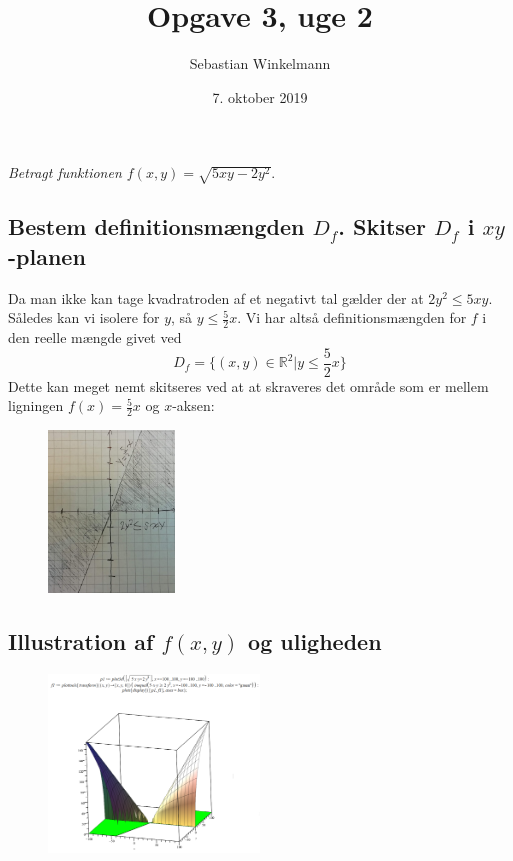 \documentclass{report}
\title{Opgave 3, uge 2}
\author{Sebastian Winkelmann}
\date{7. oktober 2019}
\begin{document}

\setcounter{chapter}{3}
\section{}
\textit{Betragt funktionen $f(x,y)=\sqrt{5xy-2y^2}$}.
\subsection{Bestem definitionsmængden $D_f$. Skitser $D_f$ i $xy$-planen}
Da man ikke kan tage kvadratroden af et negativt tal gælder der at $2y^2\leq5xy$. Således kan vi isolere for $y$, så $y\leq\frac{5}{2}x$. Vi har altså definitionsmængden for $f$ i den reelle mængde givet ved\begin{equation}
    D_f=\{(x,y)\in\mathbb{R}^2|y\leq\frac{5}{2}x\}
\end{equation}Dette kan meget nemt skitseres ved at at skraveres det område som er mellem ligningen $f(x)=\frac{5}{2}x$ og $x$-aksen:
\begin{figure}[H]
    \centering
    \includegraphics[width=0.3\textwidth]{31aa.png}
\end{figure}
\subsection{Illustration af $f(x,y)$ og uligheden}
\begin{figure}[H]
    \centering
    \includegraphics[width=0.5\textwidth]{31b.png}
\end{figure}
\end{document}

